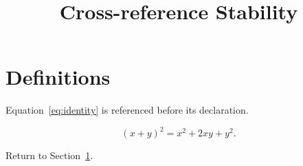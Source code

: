\documentclass{article}
\title{Cross-reference Stability}
\begin{document}
\maketitle
\section{Definitions}\label{sec:definitions}
Equation~\ref{eq:identity} is referenced before its declaration.

\begin{equation}\label{eq:identity}
  (x+y)^2 = x^2 + 2xy + y^2.
\end{equation}

Return to Section~\ref{sec:definitions}.
\end{document}
